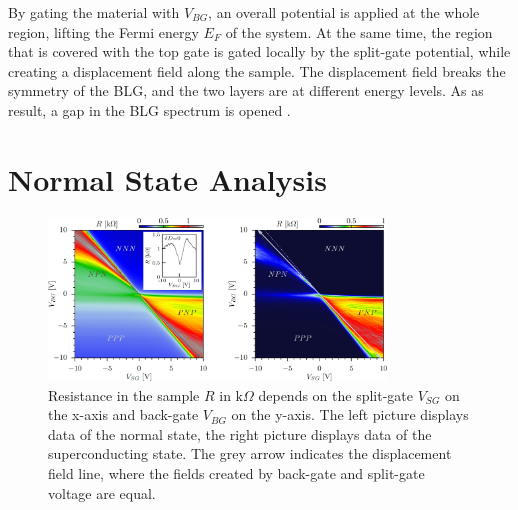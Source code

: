 By gating the material with $V_{BG}$, an overall potential is applied at the whole region, lifting the Fermi energy $E_F$ of the system. At the same time, the region that is covered with the top gate is gated locally by the split-gate potential, while creating a displacement field along the sample. The displacement field breaks the symmetry of the BLG, and the two layers are at different energy levels. As as result, a gap in the BLG spectrum is opened \cite{McCann2006}. 

\section{Normal State Analysis}
\begin{figure}
\centering
\includegraphics[width=0.8\textwidth]{figure/experiment/resistance-map-edit}
\caption{Resistance in the sample $R$ in $\text{k}\Omega$ depends on the split-gate $V_{SG}$ on the x-axis and back-gate $V_{BG}$ on the y-axis. The left picture displays data of the normal state, the right picture displays data of the superconducting state. The grey arrow indicates the displacement field line, where the fields created by back-gate and split-gate voltage are equal.}\label{fig:gate-map}
\end{figure}

